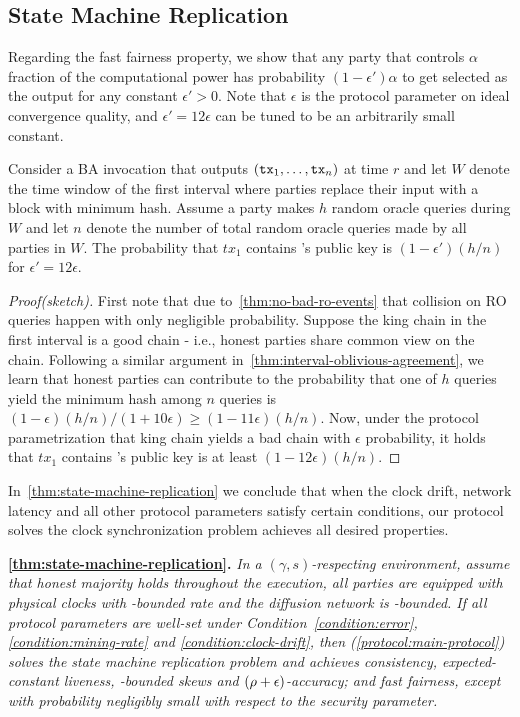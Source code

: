 \subsection{State Machine Replication}

Regarding the fast fairness property, we show that any party that controls $\alpha$ fraction of the computational power has probability $(1 - \epsilon')\alpha$ to get selected as the output for any constant $\epsilon' > 0$.
%
Note that $\epsilon$ is the protocol parameter on ideal convergence quality, and $\epsilon' = 12 \epsilon$ can be tuned to be an arbitrarily small constant.

\begin{lemma} \label{lemma:fast-fairness}
    Consider a BA invocation that outputs $(\mathtt{tx}_1, \ldots, \mathtt{tx}_n)$ at time $r$ and let $W$ denote the time window of the first interval where parties replace their input with a block with minimum hash.
    Assume a party \party makes $h$ random oracle queries during $W$ and let $n$ denote the number of total random oracle queries made by all parties in $W$.
    The probability that $tx_1$ contains \party's public key is $(1 - \epsilon')(h / n)$ for $\epsilon' = 12\epsilon$.
\end{lemma}

\begin{proof}[Proof(sketch)]
    First note that due to~\cref{thm:no-bad-ro-events} that collision on RO queries happen with only negligible probability.
    Suppose the king chain in the first interval is a good chain - i.e., honest parties share common view on the chain.
    Following a similar argument in~\cref{thm:interval-oblivious-agreement}, we learn that honest parties can contribute to  the probability that one of $h$ queries yield the minimum hash among $n$ queries is $(1 - \epsilon)(h / n) / (1 + 10 \epsilon) \ge (1 - 11 \epsilon) (h / n)$.
    Now, under the protocol parametrization that king chain yields a bad chain with $\epsilon$ probability, it holds that $tx_1$ contains \party's public key is at least $(1 - 12\epsilon)(h / n)$.
\end{proof}

In~\cref{thm:state-machine-replication} we conclude that when the clock drift, network latency and all other protocol parameters satisfy certain conditions, our protocol \pSMR solves the clock synchronization problem achieves all desired properties.

\medskip\noindent\textbf{\cref{thm:state-machine-replication}.}\textit{
    In a $(\gamma, s)$-respecting environment, assume that honest majority holds throughout the execution, all parties are equipped with physical clocks with \clockDrift-bounded rate and the diffusion network is \delay-bounded.
    If all protocol parameters are well-set under Condition~\eqref{condition:error}, \eqref{condition:mining-rate} and \eqref{condition:clock-drift}, then \pSMR (\cref{protocol:main-protocol}) solves the state machine replication problem and achieves consistency, expected-constant liveness, \maxSkew-bounded skews and $(\rho + \epsilon)$-accuracy; and fast fairness, except with probability negligibly small with respect to the security parameter.
}

